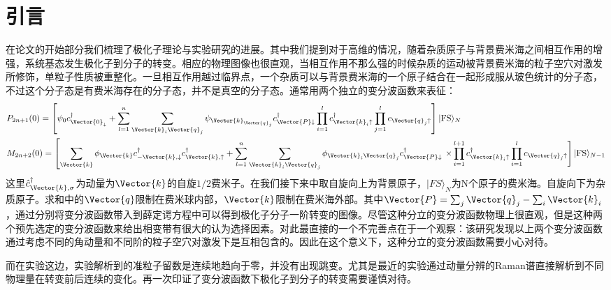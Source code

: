 \section{引言}
在论文的开始部分我们梳理了极化子理论与实验研究的进展。其中我们提到对于高维的情况，随着杂质原子与背景费米海之间相互作用的增强，系统基态发生极化子到分子的转变。相应的物理图像也很直观，当相互作用不那么强的时候杂质的运动被背景费米海的粒子空穴对激发所修饰，单粒子性质被重整化。一旦相互作用越过临界点，一个杂质可以与背景费米海的一个原子结合在一起形成服从玻色统计的分子态，不过这个分子态是有费米海存在的分子态，并不是真空的分子态。通常用两个独立的变分波函数来表征：
\begin{equation}
\begin{aligned}
&P_{2 n+1}(0) =\left[\psi_{0} c_{\Vector{0}_{\downarrow}}^{\dagger}+\sum_{l=1}^{n} \sum_{\Vector{k}_{i} \Vector{q}_{j}} \psi_{\Vector{k}_{\Vector{q}_{j}}} c_{\Vector{P} \downarrow}^{\dagger} \prod_{i=1}^{l} c_{\Vector{k}_{i} \uparrow}^{\dagger} \prod_{j=1}^{l} c_{\Vector{q}_{j} \uparrow}\right]|\mathrm{FS}\rangle_{N}\\
&M_{2 n+2}(0)= {\left[\sum_{\Vector{k}} \phi_{\Vector{k}} c_{-\Vector{k}, \downarrow}^{\dagger} c_{\Vector{k}, \uparrow}^{\dagger}+\sum_{l=1}^{n} \sum_{\Vector{k}_{i} \Vector{q}_{j}} \phi_{\Vector{k}_{i} \Vector{q}_{j}} c_{\Vector{P} \downarrow}^{\dagger}\right.} \left.\times \prod_{i=1}^{l+1} c_{\Vector{k}_{i} \uparrow}^{\dagger} \prod_{i=1}^{l} c_{\Vector{q}_{j} \uparrow}\right]|\mathrm{FS}\rangle_{N-1}
\end{aligned}
\end{equation}
这里$\hat{c}^\dagger_{\Vector{k},\sigma}$为动量为$\Vector{k}$的自旋$1/2$费米子。在我们接下来中取自旋向上为背景原子，$|FS\rangle_N$为N个原子的费米海。自旋向下为杂质原子。求和中的$\Vector{q}$限制在费米球内部，$\Vector{k}$限制在费米海外部。其中$\Vector{P}=\sum_{j} \Vector{q}_{j}-\sum_{i} \Vector{k}_{i}$，通过分别将变分波函数带入到薛定谔方程中可以得到极化子分子一阶转变的图像。尽管这种分立的变分波函数物理上很直观，但是这种两个预先选定的变分波函数来给出相变带有很大的认为选择因素。对此最直接的一个不完善点在于一个观察\cite{edwards2013smooth}：该研究发现以上两个变分波函数通过考虑不同的角动量和不同阶的粒子空穴对激发下是互相包含的。因此在这个意义下，这种分立的变分波函数需要小心对待。

而在实验这边，实验解析到的准粒子留数是连续地趋向于零，并没有出现跳变。尤其是最近的实验通过动量分辨的Raman谱直接解析到不同物理量在转变前后连续的变化\cite{Sagi2020}。再一次印证了变分波函数下极化子到分子的转变需要谨慎对待。

